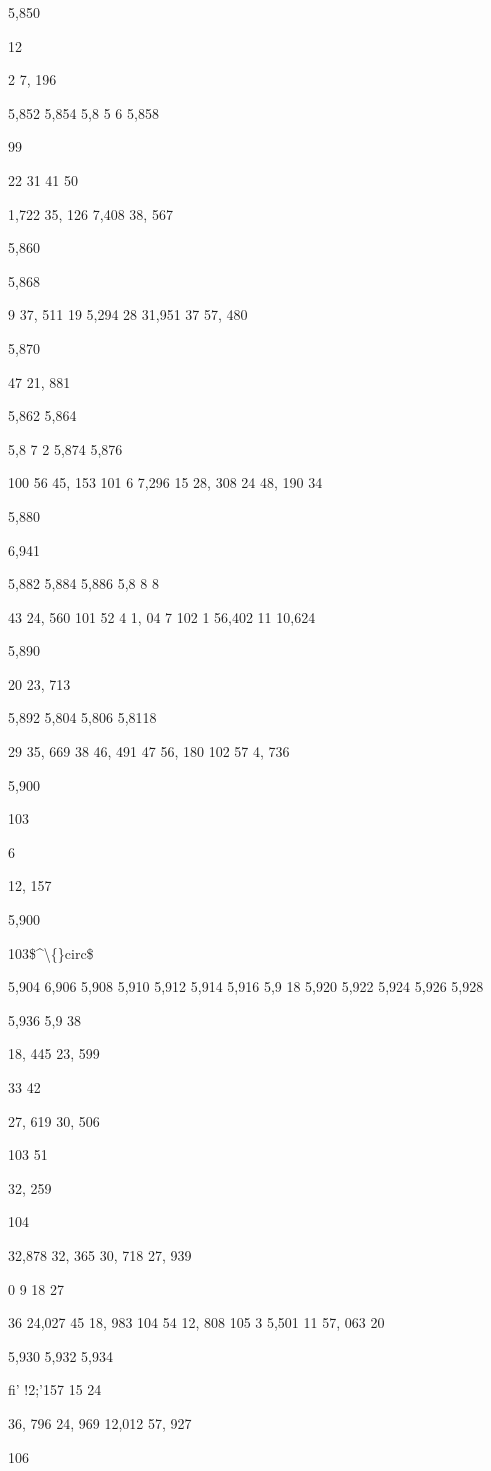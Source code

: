 \documentclass[10pt,a4paper]{article}
\begin{document}
5,850

12

2 7, 196

5,852
5,854
5,8 5 6
5,858

99

22
31
41
50

1,722
35, 126
7,408
38, 567

5,860

5,868

9 37, 511
19 5,294
28 31,951
37 57, 480

5,870

47 21, 881

5,862
5,864

5,8 7 2
5,874
5,876

100 56 45, 153
101 6
7,296
15 28, 308
24 48, 190
34

5,880

6,941

5,882
5,884
5,886
5,8 8 8

43 24, 560
101 52 4 1, 04 7
102 1 56,402
11 10,624

5,890

20 23, 713

5,892
5,804
5,806
5,8118

29 35, 669
38 46, 491
47 56, 180
102 57
4, 736

5,900

103

6

12, 157

5,900

103\$\textasciicircum{}\textbackslash\{\}circ\$

5,904
6,906
5,908
5,910
5,912
5,914
5,916
5,9 18
5,920
5,922
5,924
5,926
5,928

5,936
5,9 38

18, 445
23, 599

33
42

27, 619
30, 506

103 51

32, 259

104

32,878
32, 365
30, 718
27, 939

0
9
18
27

36 24,027
45 18, 983
104 54 12, 808
105 3
5,501
11 57, 063
20

5,930
5,932
5,934

fi' !2;'157
15
24

36, 796
24, 969
12,012
57, 927

106
\end{document}
